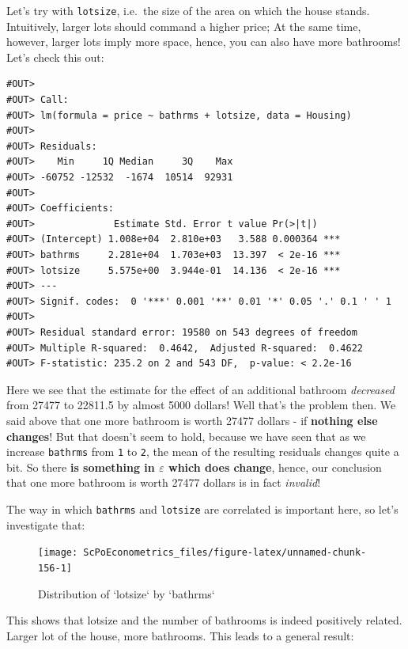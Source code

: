 \documentclass[]{book}
\theoremstyle{definition}
\theoremstyle{definition}
\theoremstyle{definition}
\theoremstyle{remark}
\begin{document}
Let's try with \texttt{lotsize}, i.e.~the size of the area on which the
house stands. Intuitively, larger lots should command a higher price; At
the same time, however, larger lots imply more space, hence, you can
also have more bathrooms! Let's check this out:

\begin{verbatim}
#OUT> 
#OUT> Call:
#OUT> lm(formula = price ~ bathrms + lotsize, data = Housing)
#OUT> 
#OUT> Residuals:
#OUT>    Min     1Q Median     3Q    Max 
#OUT> -60752 -12532  -1674  10514  92931 
#OUT> 
#OUT> Coefficients:
#OUT>              Estimate Std. Error t value Pr(>|t|)    
#OUT> (Intercept) 1.008e+04  2.810e+03   3.588 0.000364 ***
#OUT> bathrms     2.281e+04  1.703e+03  13.397  < 2e-16 ***
#OUT> lotsize     5.575e+00  3.944e-01  14.136  < 2e-16 ***
#OUT> ---
#OUT> Signif. codes:  0 '***' 0.001 '**' 0.01 '*' 0.05 '.' 0.1 ' ' 1
#OUT> 
#OUT> Residual standard error: 19580 on 543 degrees of freedom
#OUT> Multiple R-squared:  0.4642,  Adjusted R-squared:  0.4622 
#OUT> F-statistic: 235.2 on 2 and 543 DF,  p-value: < 2.2e-16
\end{verbatim}

Here we see that the estimate for the effect of an additional bathroom
\emph{decreased} from 27477 to 22811.5 by almost 5000 dollars! Well
that's the problem then. We said above that one more bathroom is worth
27477 dollars - if \textbf{nothing else changes}! But that doesn't seem
to hold, because we have seen that as we increase \texttt{bathrms} from
\texttt{1} to \texttt{2}, the mean of the resulting residuals changes
quite a bit. So there \textbf{is something in \(\varepsilon\) which does
change}, hence, our conclusion that one more bathroom is worth 27477
dollars is in fact \emph{invalid}!

The way in which \texttt{bathrms} and \texttt{lotsize} are correlated is
important here, so let's investigate that:

\begin{figure}

{\centering \texttt{[image: ScPoEconometrics\_files/figure-latex/unnamed-chunk-156-1]} 

}

\caption{Distribution of `lotsize` by `bathrms`}\label{fig:unnamed-chunk-156}
\end{figure}

This shows that lotsize and the number of bathrooms is indeed positively
related. Larger lot of the house, more bathrooms. This leads to a
general result:
\end{document}
